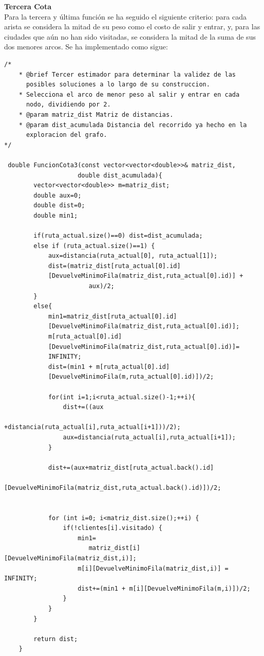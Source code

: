 \documentclass[a4paper,12pt,twoside]{article} %
\begin{document}
\newpage
\textbf{Tercera Cota}\\

Para la tercera y última función se ha seguido el siguiente criterio: para cada arista se considera la mitad de su peso como el costo de salir y entrar, y, para las ciudades que aún no han sido visitadas, se considera la mitad de la suma de sus dos menores arcos. Se ha implementado como sigue:

\lstset{language=C++}
\begin{lstlisting}
/*
    * @brief Tercer estimador para determinar la validez de las
      posibles soluciones a lo largo de su construccion.
    * Selecciona el arco de menor peso al salir y entrar en cada
      nodo, dividiendo por 2.
    * @param matriz_dist Matriz de distancias.
    * @param dist_acumulada Distancia del recorrido ya hecho en la
      exploracion del grafo.
*/

 double FuncionCota3(const vector<vector<double>>& matriz_dist,
                    double dist_acumulada){
        vector<vector<double>> m=matriz_dist;
        double aux=0;
        double dist=0;
        double min1;

        if(ruta_actual.size()==0) dist=dist_acumulada;
        else if (ruta_actual.size()==1) {
            aux=distancia(ruta_actual[0], ruta_actual[1]);
            dist=(matriz_dist[ruta_actual[0].id]
            [DevuelveMinimoFila(matriz_dist,ruta_actual[0].id)] + 
                       aux)/2;
        }
        else{
            min1=matriz_dist[ruta_actual[0].id]
            [DevuelveMinimoFila(matriz_dist,ruta_actual[0].id)];
            m[ruta_actual[0].id]
            [DevuelveMinimoFila(matriz_dist,ruta_actual[0].id)]=
            INFINITY;
            dist=(min1 + m[ruta_actual[0].id]
            [DevuelveMinimoFila(m,ruta_actual[0].id)])/2;

            for(int i=1;i<ruta_actual.size()-1;++i){
                dist+=((aux
                        +distancia(ruta_actual[i],ruta_actual[i+1]))/2);
                aux=distancia(ruta_actual[i],ruta_actual[i+1]);
            }

            dist+=(aux+matriz_dist[ruta_actual.back().id]
            [DevuelveMinimoFila(matriz_dist,ruta_actual.back().id)])/2;


            for (int i=0; i<matriz_dist.size();++i) {
                if(!clientes[i].visitado) {
                    min1=
                       matriz_dist[i][DevuelveMinimoFila(matriz_dist,i)];
                    m[i][DevuelveMinimoFila(matriz_dist,i)] = INFINITY;
                    dist+=(min1 + m[i][DevuelveMinimoFila(m,i)])/2;
                }
            }
        }

        return dist;
    }
\end{lstlisting}
\end{document}
